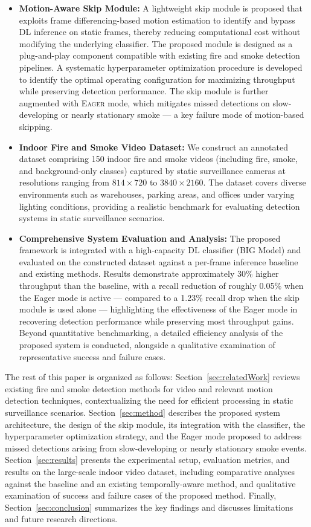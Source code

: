\documentclass[final,3p,times,twocolumn]{elsarticle}
\begin{document}
\begin{itemize}
\item \textbf{Motion-Aware Skip Module:} A lightweight skip module is
proposed that exploits frame differencing-based motion estimation to
identify and bypass DL inference on static frames, thereby reducing
computational cost without modifying the underlying classifier. The
proposed module is designed as a plug-and-play component compatible
with existing fire and smoke detection pipelines. A systematic
hyperparameter optimization procedure is developed to identify the
optimal operating configuration for maximizing throughput while
preserving detection performance. The skip module is further augmented
with \textsc{Eager} mode, which mitigates missed detections on
slow-developing or nearly stationary smoke --- a key failure mode of
motion-based skipping.
\item \textbf{Indoor Fire and Smoke Video Dataset:} We construct an
annotated dataset comprising 150 indoor fire and smoke videos
(including fire, smoke, and background-only classes) captured by
static surveillance cameras at resolutions ranging from
$814 \times 720$ to $3840 \times 2160$. The dataset covers diverse
environments such as warehouses, parking areas, and offices under
varying lighting conditions, providing a realistic benchmark for
evaluating detection systems in static surveillance scenarios.
\item \textbf{Comprehensive System Evaluation and Analysis:} The
proposed framework is integrated with a high-capacity DL classifier
(BIG Model) and evaluated on the constructed dataset against a
per-frame inference baseline and existing methods. Results demonstrate
approximately 30\% higher throughput than the baseline, with a recall
reduction of roughly 0.05\% when the Eager mode is active --- compared
to a 1.23\% recall drop when the skip module is used alone ---
highlighting the effectiveness of the Eager mode in recovering
detection performance while preserving most throughput gains. Beyond
quantitative benchmarking, a detailed efficiency analysis of the
proposed system is conducted, alongside a qualitative examination of
representative success and failure cases.
\end{itemize}

The rest of this paper is organized as follows: Section~\ref{sec:relatedWork}
reviews existing fire and smoke detection methods for video and relevant
motion detection techniques, contextualizing the need for efficient
processing in static surveillance scenarios. Section~\ref{sec:method}
describes the proposed system architecture, the design of the skip
module, its integration with the classifier, the hyperparameter
optimization strategy, and the Eager mode proposed to address missed
detections arising from slow-developing or nearly stationary smoke
events. Section~\ref{sec:results} presents the experimental setup,
evaluation metrics, and results on the large-scale indoor video dataset,
including comparative analyses against the baseline and an existing
temporally-aware method, and qualitative examination of success and
failure cases of the proposed method. Finally,
Section~\ref{sec:conclusion} summarizes the key findings and discusses
limitations and future research directions.
\end{document}
